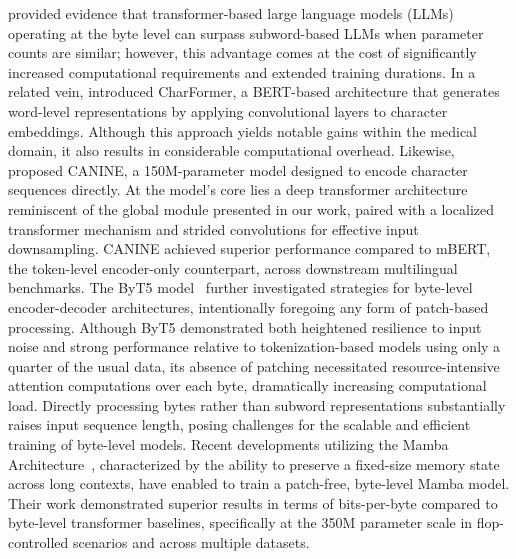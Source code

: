\cite{Choe2019BridgingTG} provided evidence that transformer-based large language models (LLMs) operating at the byte level can surpass subword-based LLMs when parameter counts are similar; however, this advantage comes at the cost of significantly increased computational requirements and extended training durations. In a related vein, \cite{el2020characterbert} introduced CharFormer, a BERT-based architecture that generates word-level representations by applying convolutional layers to character embeddings. Although this approach yields notable gains within the medical domain, it also results in considerable computational overhead. Likewise, \cite{clark2022canine} proposed CANINE, a 150M-parameter model designed to encode character sequences directly. At the model's core lies a deep transformer architecture reminiscent of the global module presented in our work, paired with a localized transformer mechanism and strided convolutions for effective input downsampling. CANINE achieved superior performance compared to mBERT, the token-level encoder-only counterpart, across downstream multilingual benchmarks. The ByT5 model~\citep{xue2022byt5} further investigated strategies for byte-level encoder-decoder architectures, intentionally foregoing any form of patch-based processing. Although ByT5 demonstrated both heightened resilience to input noise and strong performance relative to tokenization-based models using only a quarter of the usual data, its absence of patching necessitated resource-intensive attention computations over each byte, dramatically increasing computational load. Directly processing bytes rather than subword representations substantially raises input sequence length, posing challenges for the scalable and efficient training of byte-level models. Recent developments utilizing the Mamba Architecture~\citep{gu2023mamba}, characterized by the ability to preserve a fixed-size memory state across long contexts, have enabled \cite{wang2024mambabyte} to train a patch-free, byte-level Mamba model. Their work demonstrated superior results in terms of bits-per-byte compared to byte-level transformer baselines, specifically at the 350M parameter scale in flop-controlled scenarios and across multiple datasets.


